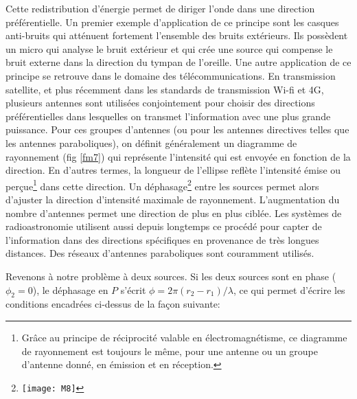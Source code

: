 Cette redistribution d'énergie permet de diriger l'onde dans une direction préférentielle. Un premier exemple d'application de ce principe sont les casques anti-bruits qui atténuent fortement l'ensemble des bruits extérieurs. Ils possèdent un micro qui analyse le bruit extérieur et qui crée une source qui compense le bruit externe dans la direction du tympan de l'oreille. Une autre application de ce principe se retrouve dans le domaine des télécommunications. En transmission satellite, et plus récemment dans les standards de transmission Wi-fi et 4G, plusieurs antennes sont utilisées conjointement pour choisir des directions préférentielles dans lesquelles on transmet l'information avec une plus grande puissance. Pour ces groupes d'antennes (ou pour les antennes directives telles que les antennes paraboliques), on définit généralement un diagramme de rayonnement (fig \ref{fm7}) qui représente l'intensité qui est envoyée en fonction de la direction. En d'autres termes, la longueur de l'ellipse reflète l'intensité émise ou perçue\footnote{Grâce au principe de réciprocité valable en électromagnétisme, ce diagramme de rayonnement est toujours le même, pour une antenne ou un groupe d'antenne donné, en émission et en réception.} dans cette direction.   Un déphasage\footnote{\texttt{[image: M8]}} entre les sources permet alors d'ajuster la direction d'intensité maximale de rayonnement. L'augmentation du nombre d'antennes permet une direction de plus en plus ciblée.
Les systèmes de radioastronomie utilisent aussi depuis longtemps ce procédé pour capter de l'information dans des directions spécifiques en provenance de très longues distances. Des réseaux d'antennes paraboliques sont couramment utilisés.

Revenons à notre problème à deux sources. Si les deux sources sont en phase ($\phi_2=0$), le déphasage en $P$ s'écrit $\phi=2\pi(r_2-r_1)/\lambda$, ce qui permet d'écrire les conditions encadrées ci-dessus de la façon suivante:



